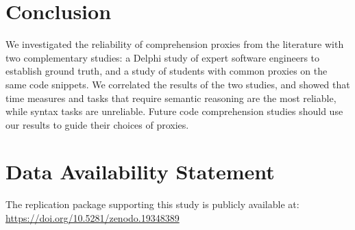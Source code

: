 \section{Conclusion}

We investigated the reliability of comprehension
proxies from the literature with two complementary studies:
a Delphi study of expert software engineers to establish
ground truth, and a study of students with common proxies on the same code snippets.
We correlated the results of the two studies, and showed
that time measures and tasks that require semantic reasoning
are the most reliable, while syntax tasks are unreliable.
Future code comprehension studies should use our results
to guide their choices of proxies.

\medskip
\section*{Data Availability Statement}

The replication package supporting this study is publicly available at:
\url{https://doi.org/10.5281/zenodo.19348389}

 